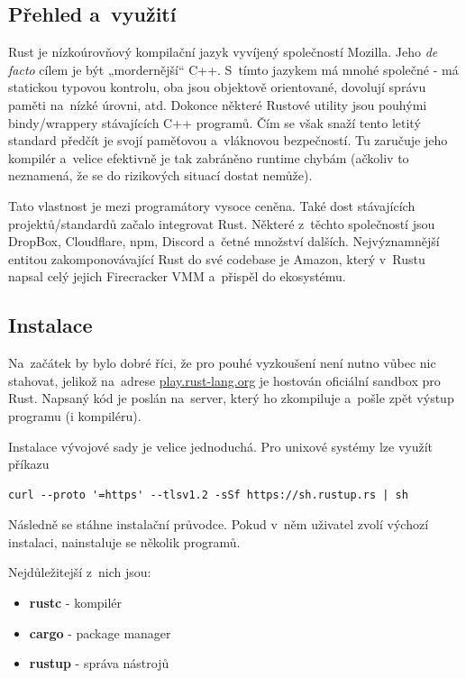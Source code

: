 \documentclass[a4paper, 12pt]{article} %
\begin{document}
	\subsection{Přehled a~využití}
		Rust je nízkoúrovňový kompilační jazyk vyvíjený společností Mozilla. Jeho \textit{de facto} cílem je být „mordernější“ C++. S~tímto jazykem má mnohé společné - má statickou typovou kontrolu, oba jsou objektově orientované, dovolují správu paměti na~nízké úrovni, atd. Dokonce některé Rustové utility jsou pouhými bindy/wrappery stávajících C++ programů. Čím se však snaží tento letitý standard předčít je svojí paměťovou a~vláknovou bezpečností. Tu zaručuje jeho kompilér a~velice efektivně je tak zabráněno runtime chybám (ačkoliv to neznamená, že se do rizikových situací dostat nemůže).

		Tato vlastnost je mezi programátory vysoce ceněna. Také dost stávajících projektů/standardů začalo integrovat Rust. Některé z~těchto společností jsou DropBox\cite{dropbox}, Cloudflare\cite{cloudflare}, npm\cite{npm}, Discord\cite{discord} a~četné množství dalších. Nejvýznamnější entitou zakomponovávající Rust do své codebase je Amazon\cite{amazon}, který v~Rustu napsal celý jejich Firecracker VMM a~přispěl do ekosystému.


	\subsection{Instalace}
		Na~začátek by bylo dobré říci, že pro pouhé vyzkoušení není nutno vůbec nic stahovat, jelikož na~adrese \href{https://play.rust-lang.org/}{play.rust-lang.org} je hostován oficiální sandbox pro Rust. Napsaný kód je poslán na~server, který ho zkompiluje a~pošle zpět výstup programu (i kompiléru).
	
		Instalace vývojové sady je velice jednoduchá. Pro unixové systémy lze využít příkazu
		\begin{verbatim}
curl --proto '=https' --tlsv1.2 -sSf https://sh.rustup.rs | sh
		\end{verbatim}
		Následně se stáhne instalační průvodce. Pokud v~něm uživatel zvolí výchozí instalaci, nainstaluje se několik programů.
		
		Nejdůležitejší z~nich jsou:
		\begin{itemize}
			\item \textbf{rustc} - kompilér
			\item \textbf{cargo} - package manager
			\item \textbf{rustup} - správa nástrojů
		\end{itemize}
\end{document}
